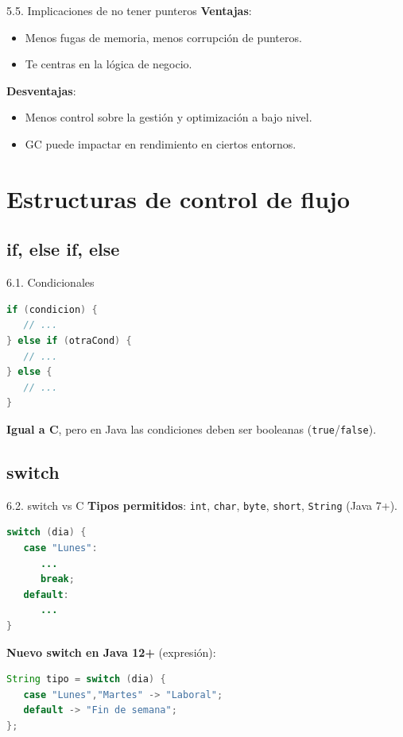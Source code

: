 \documentclass{beamer}
\begin{document}
\begin{frame}{5.5. Implicaciones de no tener punteros}
\textbf{Ventajas}:
\begin{itemize}
  \item Menos fugas de memoria, menos corrupción de punteros.
  \item Te centras en la lógica de negocio.
\end{itemize}

\textbf{Desventajas}:
\begin{itemize}
  \item Menos control sobre la gestión y optimización a bajo nivel.
  \item GC puede impactar en rendimiento en ciertos entornos.
\end{itemize}
\end{frame}

\section{Estructuras de control de flujo}

\subsection{if, else if, else}

\begin{frame}[fragile]{6.1. Condicionales}
\begin{lstlisting}[language=Java]
if (condicion) {
   // ...
} else if (otraCond) {
   // ...
} else {
   // ...
}
\end{lstlisting}

\textbf{Igual a C}, pero en Java las condiciones deben ser booleanas (\texttt{true}/\texttt{false}).
\end{frame}

\subsection{switch}

\begin{frame}[fragile]{6.2. switch vs C}
\textbf{Tipos permitidos}: \texttt{int}, \texttt{char}, \texttt{byte}, \texttt{short}, \texttt{String} (Java 7+).

\begin{lstlisting}[language=Java]
switch (dia) {
   case "Lunes":
      ...
      break;
   default:
      ...
}
\end{lstlisting}

\textbf{Nuevo switch en Java 12+} (expresión):
\begin{lstlisting}[language=Java]
String tipo = switch (dia) {
   case "Lunes","Martes" -> "Laboral";
   default -> "Fin de semana";
};
\end{lstlisting}
\end{frame}
\end{document}
